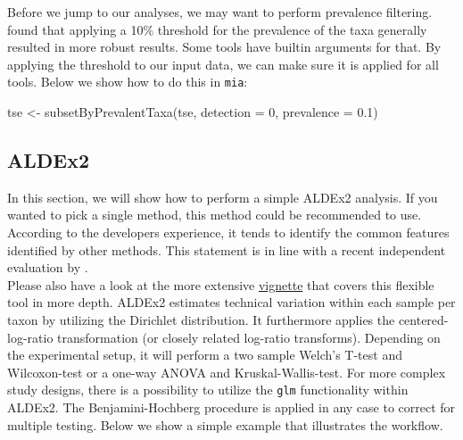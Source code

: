 \documentclass[
]{book}
\newenvironment{Shaded}{\begin{snugshade}}{\end{snugshade}}
\newcommand{\AttributeTok}[1]{\textcolor[rgb]{0.77,0.63,0.00}{#1}}
\newcommand{\CommentTok}[1]{\textcolor[rgb]{0.56,0.35,0.01}{\textit{#1}}}
\newcommand{\DecValTok}[1]{\textcolor[rgb]{0.00,0.00,0.81}{#1}}
\newcommand{\FloatTok}[1]{\textcolor[rgb]{0.00,0.00,0.81}{#1}}
\newcommand{\FunctionTok}[1]{\textcolor[rgb]{0.00,0.00,0.00}{#1}}
\newcommand{\NormalTok}[1]{#1}
\newcommand{\OtherTok}[1]{\textcolor[rgb]{0.56,0.35,0.01}{#1}}
\newcommand{\SpecialCharTok}[1]{\textcolor[rgb]{0.00,0.00,0.00}{#1}}
\begin{document}
Before we jump to our analyses, we may want to perform prevalence filtering.
\citet{Nearing2022} found that applying a 10\% threshold
for the prevalence of the taxa generally resulted in more robust results.
Some tools have builtin arguments for that. By applying the threshold to our
input data, we can make sure it is applied for all tools. Below we show how to
do this in \texttt{mia}:

\begin{Shaded}
\begin{Highlighting}[]
\NormalTok{tse }\OtherTok{\textless{}{-}} \FunctionTok{subsetByPrevalentTaxa}\NormalTok{(tse, }\AttributeTok{detection =} \DecValTok{0}\NormalTok{, }\AttributeTok{prevalence =} \FloatTok{0.1}\NormalTok{)}
\end{Highlighting}
\end{Shaded}

\hypertarget{aldex2}{%
\subsection{ALDEx2}\label{aldex2}}

In this section, we will show how to perform a simple ALDEx2 analysis.
If you wanted to pick a single method, this method could be recommended to use.
According to the developers experience, it tends to identify the common
features identified by other methods. This statement is in line with a recent
independent evaluation by \citet{Nearing2022}.\\
Please also have a look at the more extensive
\href{https://bioconductor.org/packages/release/bioc/vignettes/ALDEx2/inst/doc/ALDEx2_vignette.html}{vignette}
that covers this flexible tool in more depth. ALDEx2 estimates technical
variation within each sample per taxon by utilizing the Dirichlet distribution.
It furthermore applies the centered-log-ratio transformation (or closely
related log-ratio transforms). Depending on the experimental setup, it will
perform a two sample Welch's T-test and Wilcoxon-test or a one-way ANOVA and
Kruskal-Wallis-test. For more complex study designs, there is a possibility to
utilize the \texttt{glm} functionality within ALDEx2. The Benjamini-Hochberg procedure
is applied in any case to correct for multiple testing. Below we show a simple
example that illustrates the workflow.

\begin{Shaded}
\end{Shaded}
\end{document}
